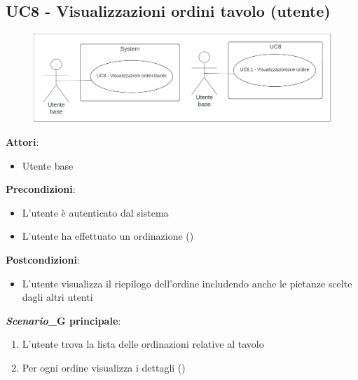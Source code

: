 \subsection{UC8 - Visualizzazioni ordini tavolo (utente)}\label{usecase:8}
\begin{figure}[H]
    \centering
    \includegraphics[width=0.9\linewidth]{ucd/ucd8.png}
\end{figure}
\textbf{Attori}:
\begin{itemize}
    \item Utente base
\end{itemize}
\textbf{Precondizioni}:
\begin{itemize}
    \item L'utente è autenticato dal sistema
    \item L'utente ha effettuato un ordinazione ()
\end{itemize}
\textbf{Postcondizioni}:
\begin{itemize}
    \item L'utente visualizza il riepilogo dell'ordine includendo anche le pietanze scelte dagli altri utenti
\end{itemize}
\textbf{\textit{Scenario}_G principale}:
\begin{enumerate}
    \item L'utente trova la lista delle ordinazioni relative al tavolo
    \item Per ogni ordine visualizza i dettagli ()
\end{enumerate}
